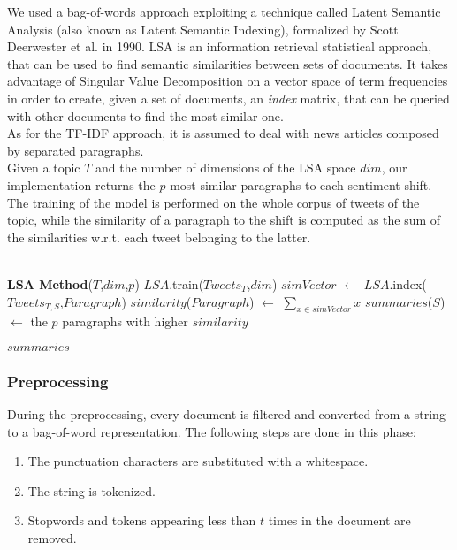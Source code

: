 We used a bag-of-words approach exploiting a technique called Latent Semantic Analysis (also known as Latent Semantic Indexing), formalized by Scott Deerwester et al. in 1990\cite{LSA}. LSA is an information retrieval statistical approach, that can be used to find semantic similarities between sets of documents. It takes advantage of Singular Value Decomposition on a vector space of term frequencies in order to create, given a set of documents, an \emph{index} matrix, that can be queried with other documents to find the most similar one.
\\
As for the TF-IDF approach, it is assumed to deal with news articles composed by separated paragraphs.
\\
Given a topic $T$ and the number of dimensions of the LSA space $dim$, our implementation returns the $p$ most similar paragraphs to each sentiment shift. The training of the model is performed on the whole corpus of tweets of the topic, while the similarity of a paragraph to the shift is computed as the sum of the similarities w.r.t. each tweet belonging to the latter.
\\\\
\begin{algorithmic}
\STATE \textbf{LSA Method}($T$,$dim$,$p$)
\STATE
\STATE $LSA$.train($Tweets_T$,$dim$)
\STATE
{}
			\STATE $simVector$ $\leftarrow$ $LSA$.index($Tweets_{T,S}$,$Paragraph$)
			\STATE $similarity$($Paragraph$) $\leftarrow$ $\sum_{x \in simVector} x $
		\ENDFOR
	\ENDFOR
	\STATE $summaries$($S$) $\leftarrow$ the $p$ paragraphs with higher $similarity$

\ENDFOR
\STATE
\RETURN $summaries$

\end{algorithmic}

\subsubsection*{Preprocessing}
During the preprocessing, every document is filtered and converted from a string to a bag-of-word representation. The following steps are done in this phase:
\begin{enumerate}
\item The punctuation characters are substituted with a whitespace.
\item The string is tokenized.
\item Stopwords and tokens appearing less than $t$ times in the document are removed.
\end{enumerate}


